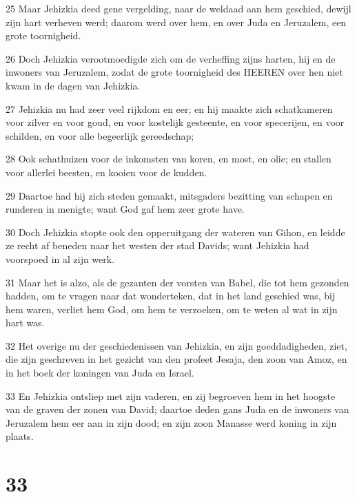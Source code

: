 \par 25 Maar Jehizkia deed gene vergelding, naar de weldaad aan hem geschied, dewijl zijn hart verheven werd; daarom werd over hem, en over Juda en Jeruzalem, een grote toornigheid.
\par 26 Doch Jehizkia verootmoedigde zich om de verheffing zijns harten, hij en de inwoners van Jeruzalem, zodat de grote toornigheid des HEEREN over hen niet kwam in de dagen van Jehizkia.
\par 27 Jehizkia nu had zeer veel rijkdom en eer; en hij maakte zich schatkameren voor zilver en voor goud, en voor kostelijk gesteente, en voor specerijen, en voor schilden, en voor alle begeerlijk gereedschap;
\par 28 Ook schathuizen voor de inkomsten van koren, en most, en olie; en stallen voor allerlei beesten, en kooien voor de kudden.
\par 29 Daartoe had hij zich steden gemaakt, mitsgaders bezitting van schapen en runderen in menigte; want God gaf hem zeer grote have.
\par 30 Doch Jehizkia stopte ook den opperuitgang der wateren van Gihon, en leidde ze recht af beneden naar het westen der stad Davids; want Jehizkia had voorspoed in al zijn werk.
\par 31 Maar het is alzo, als de gezanten der vorsten van Babel, die tot hem gezonden hadden, om te vragen naar dat wonderteken, dat in het land geschied was, bij hem waren, verliet hem God, om hem te verzoeken, om te weten al wat in zijn hart was.
\par 32 Het overige nu der geschiedenissen van Jehizkia, en zijn goeddadigheden, ziet, die zijn geschreven in het gezicht van den profeet Jesaja, den zoon van Amoz, en in het boek der koningen van Juda en Israel.
\par 33 En Jehizkia ontsliep met zijn vaderen, en zij begroeven hem in het hoogste van de graven der zonen van David; daartoe deden gans Juda en de inwoners van Jeruzalem hem eer aan in zijn dood; en zijn zoon Manasse werd koning in zijn plaats.

\chapter{33}


